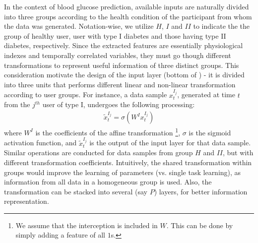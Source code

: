 In the context of blood glucose prediction, available inputs are naturally divided into three groups according to the health condition of the participant from whom the data was generated.
Notation-wise, we utilize $H$, $I$ and $II$ to indicate the the group of healthy user, user with type I diabetes and those having type II diabetes, respectively.
Since the extracted features are essentially physiological indexes and temporally correlated variables, they must go though different transformations to represent useful information of three distinct groups.
This consideration motivate the design of the input layer (bottom of ) - it is divided into three units that performs different linear and non-linear transformation according to user groups.
For instance, a data sample $x_t^{I_j}$, generated at time $t$ from the $j^{th}$ user of type I, undergoes the following processing:
\begin{align}
\tilde{x}_t^{I_j} = \sigma \left( W^Ix_t^{I_j} \right)
\end{align}
where $W^I$ is the coefficients of the affine transformation \footnote{We assume that the interception is included in $W$. This can be done by simply adding a feature of all $1$s.}, $\sigma$ is the sigmoid activation function, and $\tilde{x}_t^{I_j}$ is the output of the input layer for that data sample.
Similar operations are conducted for data samples from group $H$ and $II$, but with different transformation coefficients.
Intuitively, the shared transformation within groups would improve the learning of parameters (vs. single task learning), as information from all data in a homogeneous group is used.
Also, the transformation can be stacked into several (say $P$) layers, for better information representation.

